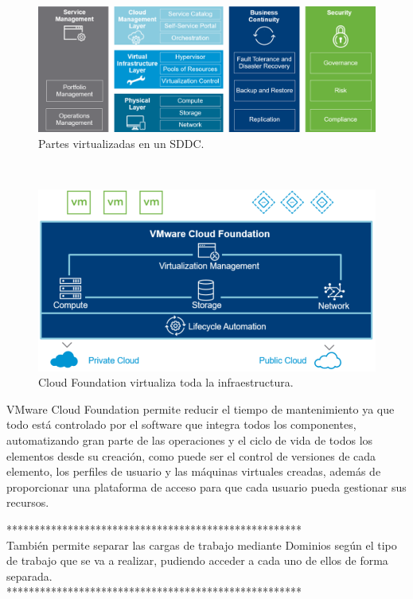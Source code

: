 \begin{figure}[h!]
  \centering
  \includegraphics[width=1\textwidth]{imaxes/cap2recursos/SDDCoverview.png}
  \caption{Partes virtualizadas en un SDDC.}
  \label{fig:sddcoverview}
\end{figure}
\\
\begin{figure}[h!]
  \centering
  \includegraphics[width=1\textwidth]{imaxes/cap2recursos/overviewCF.png}
  \caption{Cloud Foundation virtualiza toda la infraestructura.}
  \label{fig:infraCloudFound}
\end{figure}

VMware Cloud Foundation permite reducir el tiempo de mantenimiento ya que todo está controlado por el software que integra todos los componentes, automatizando gran parte de las operaciones y el ciclo de vida de todos los elementos desde su creación, como puede ser el control de versiones de cada elemento, los perfiles de usuario y las máquinas virtuales creadas, además de proporcionar una plataforma de acceso para que cada usuario pueda gestionar sus recursos.

*****************************************************\\
También permite separar las cargas de trabajo mediante Dominios según el tipo de trabajo que se va a realizar, pudiendo acceder a cada uno de ellos de forma separada.\\
*****************************************************\\

